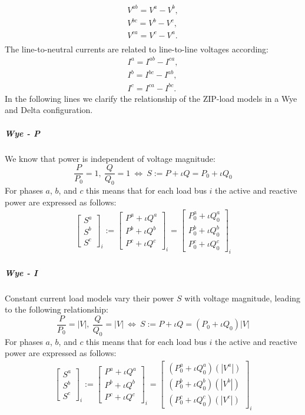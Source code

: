 \documentclass[10pt,journal]{article}
\begin{document}
\begin{align}
    V^{ab} = V^a - V^b,\\ 
    V^{bc} = V^b - V^c,\\ 
    V^{ca} = V^c - V^a.\\ 
\end{align}
The line-to-neutral currents are related to line-to-line voltages according: 
\begin{align}
    I^a=I^{ab}-I^{ca},\\
    I^b=I^{bc}-I^{ab},\\
    I^c=I^{ca}-I^{bc}.
\end{align}
In the following lines we clarify the relationship of the ZIP-load models in a Wye and Delta configuration. 
\subparagraph{Wye - P}
We know that power is independent of voltage magnitude: \begin{equation}
    \frac{P}{P_0}=1,\ \frac{Q}{Q_0}=1\ \Leftrightarrow\ S := P +\iota Q = P_0 + \iota Q_0
\end{equation}
For phases $a$, $b$, and $c$ this means that for each load bus $i$ the active and reactive power are expressed as follows: 
\begin{align}
    \begin{bmatrix}
    S^a\\
    S^b\\
    S^c
    \end{bmatrix}_i := \begin{bmatrix}
    P^a +\iota Q^a\\
    P^b +\iota Q^b\\
    P^c +\iota Q^c
    \end{bmatrix}_i = \begin{bmatrix}
    P^a_0 +\iota Q^a_0\\
    P^b_0 +\iota Q^b_0\\
    P^c_0 +\iota Q^c_0
    \end{bmatrix}_i 
\end{align}
\subparagraph{Wye - I}
Constant current load models vary their power $S$ with voltage magnitude, leading to the following relationship: 
\begin{equation}
    \frac{P}{P_0}=|V|,\ \frac{Q}{Q_0}=|V|\ \Leftrightarrow\ S := P +\iota Q = (P_0 + \iota Q_0)|V|
\end{equation}
For phases $a$, $b$, and $c$ this means that for each load bus $i$ the active and reactive power are expressed as follows: 
\begin{align}
    \begin{bmatrix}
    S^a\\
    S^b\\
    S^c
    \end{bmatrix}_i := \begin{bmatrix}
    P^a +\iota Q^a\\
    P^b +\iota Q^b\\
    P^c +\iota Q^c
    \end{bmatrix}_i = \begin{bmatrix}
    (P^a_0 +\iota Q^a_0)(|V^a|)\\
    (P^b_0 +\iota Q^b_0)(|V^b|)\\
    (P^c_0 +\iota Q^c_0)(|V^c|)
    \end{bmatrix}_i 
\end{align}
\end{document}
